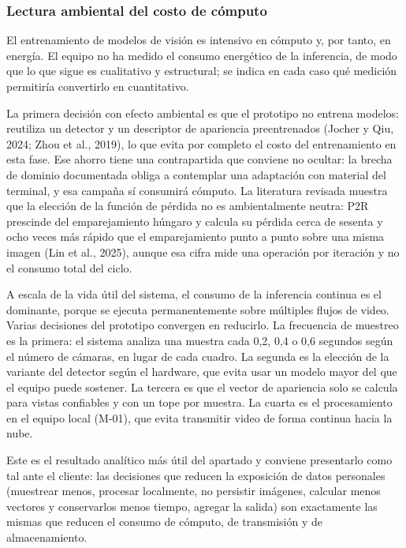 \subsubsection{Lectura ambiental del costo de cómputo}

El entrenamiento de modelos de visión es intensivo en cómputo y, por tanto, en
energía. El equipo no ha medido el consumo energético de la inferencia, de modo
que lo que sigue es cualitativo y estructural; se indica en cada caso qué
medición permitiría convertirlo en cuantitativo.

La primera decisión con efecto ambiental es que el prototipo no entrena
modelos: reutiliza un detector y un descriptor de apariencia preentrenados
(Jocher y Qiu, 2024; Zhou et al., 2019), lo que evita por completo el costo del
entrenamiento en esta fase. Ese ahorro tiene una contrapartida que conviene
no ocultar: la brecha de dominio documentada obliga a contemplar una
adaptación con material del terminal, y esa campaña sí consumirá cómputo. La
literatura revisada muestra que la elección de la función de pérdida no es
ambientalmente neutra: P2R prescinde del emparejamiento húngaro y calcula su
pérdida cerca de sesenta y ocho veces más rápido que el emparejamiento punto a
punto sobre una misma imagen (Lin et al., 2025), aunque esa cifra mide una
operación por iteración y no el consumo total del ciclo.

A escala de la vida útil del sistema, el consumo de la inferencia continua es el
dominante, porque se ejecuta permanentemente sobre múltiples flujos de video.
Varias decisiones del prototipo convergen en reducirlo. La frecuencia de
muestreo es la primera: el sistema analiza una muestra cada 0,2, 0,4 o 0,6
segundos según el número de cámaras, en lugar de cada cuadro. La segunda es la
elección de la variante del detector según el hardware, que evita usar un
modelo mayor del que el equipo puede sostener. La tercera es que el vector de
apariencia solo se calcula para vistas confiables y con un tope por muestra. La
cuarta es el procesamiento en el equipo local (M-01), que evita transmitir video
de forma continua hacia la nube.

Este es el resultado analítico más útil del apartado y conviene presentarlo
como tal ante el cliente: las decisiones que reducen la exposición de datos
personales (muestrear menos, procesar localmente, no persistir imágenes,
calcular menos vectores y conservarlos menos tiempo, agregar la salida) son
exactamente las mismas que reducen el consumo de cómputo, de transmisión y de
almacenamiento.

